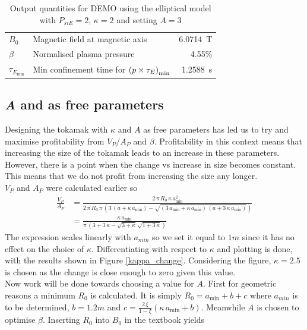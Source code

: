 \begin{table}
\begin{tabular}{llr}
		\(B_0\)                   & Magnetic field at magnetic axis                                & \SI{6.0714}{\tesla}              \\
		\(\beta\)                 & Normalised plasma pressure                                     & 4.55\%                           \\
		\(\tau_{E_\mathrm{min}}\) & Min confinement time for \(\pqty{p\times\tau_E}_\mathrm{min}\) & \SI{1.2588}{\second}             \\
		\bottomrule
	\end{tabular}
	\caption{Output quantities for DEMO using the elliptical model with $P_{si{E}}=2$, $\kappa=2$ and setting $A=3$}
	\label{tab:DEMO2}
\end{table}
\subsection{\textit{A} and \mathinhead{\kappa}{\kappa} as free parameters}
Designing the tokamak with $\kappa$ and $A$ as free parameters has led us to try and maximise profitability from $V_{P}/A_{P}$ and $\beta$. Profitability in this context means that increasing the size of the tokamak leads to an increase in these parameters. However, there is a point when the change vs increase in size becomes constant. This means that we do not profit from increasing the size any longer. \\
$V_{\si{P}}$ and $A_{\si{P}}$ were calculated earlier so
\begin{align}
	\frac{V_{\si{P}}}{A_{\si{P}}} & =\frac{2\,\pi\, R_{0}\,\kappa\, a_{\min}^{2}}{2\,\pi\, R_{0}\,\pi\, (3\,(a+\kappa\, a_{\min})-\sqrt{(3\, a_{\min}+\kappa\, a_{\min})\,(a+3\,\kappa\, a_{\min})})} \nonumber \\
	                              & =\frac{\kappa\, a_{\min}}{\pi\,(3+3\,\kappa-\sqrt{3+\kappa}\,\sqrt{1+3\,\kappa})}
\end{align}
The expression scales linearly with $a_{min}$ so we set it equal to $1\si{m}$ since it has no effect on the choice of $\kappa$. Differentiating with respect to $\kappa$ and plotting is done, with the results shown in Figure \ref{kappa_change}. Considering the figure, $\kappa=2.5$ is chosen as the change is close enough to zero given this value.\\
Now work will be done towards choosing a value for $A$. First for geometric reasons a minimum $R_{0}$ is calculated. It is simply $R_{0}=a_{\min}+b+c$ where $a_{min}$ is to be determined, $b=1.2\si{m}$ and $c=\frac{2\,\xi}{1-\xi}(\kappa\, a_{\min}+b)$. Meanwhile $A$ is chosen to optimise $\beta$. Inserting $R_{0}$ into $B_{0}$ in the textbook yields
